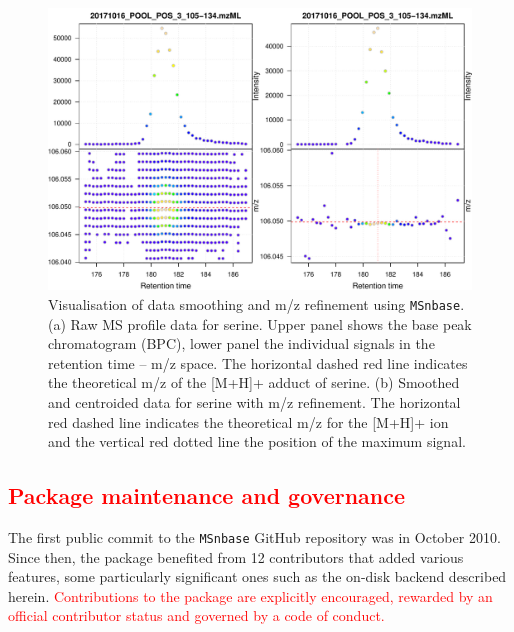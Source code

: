 \documentclass[journal=jacsat,manuscript=article]{achemso}\usepackage[]{graphicx}\usepackage[]{color}
\begin{document}
\begin{figure}
  \centering
  \includegraphics[width=\linewidth]{./figure/centroiding.pdf}
  \caption{Visualisation of data smoothing and m/z refinement using
    \texttt{MSnbase}. (a) Raw MS profile data for serine. Upper panel
    shows the base peak chromatogram (BPC), lower panel the individual
    signals in the retention time -- m/z space. The horizontal dashed
    red line indicates the theoretical m/z of the [M+H]+ adduct of
    serine. (b) Smoothed and centroided data for serine with m/z
    refinement. The horizontal red dashed line indicates the
    theoretical m/z for the [M+H]+ ion and the vertical red dotted
    line the position of the maximum signal. }
  \label{fig:cent}
\end{figure}


\subsection{\textcolor{red}{Package maintenance and governance}}

The first public commit to the \texttt{MSnbase} GitHub repository was
in October 2010. Since then, the package benefited from 12
contributors\cite{contribs} that added various features, some
particularly significant ones such as the on-disk backend described
herein. \textcolor{red}{Contributions to the package are explicitly
  encouraged, rewarded by an official contributor status and governed
  by a code of conduct.}
\end{document}
